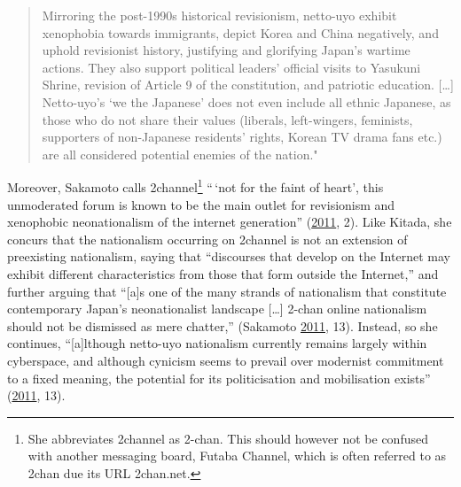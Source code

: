 \documentclass[10pt,british,A4paper,,openany]{memoir}
\begin{document}
\begin{quote}
Mirroring the post-1990s historical revisionism, netto-uyo exhibit
xenophobia towards immigrants, depict Korea and China negatively, and
uphold revisionist history, justifying and glorifying Japan's wartime
actions. They also support political leaders' official visits to
Yasukuni Shrine, revision of Article 9 of the constitution, and
patriotic education. {[}\ldots{}{]} Netto-uyo's `we the Japanese' does
not even include all ethnic Japanese, as those who do not share their
values (liberals, left-wingers, feminists, supporters of non-Japanese
residents' rights, Korean TV drama fans etc.) are all considered
potential enemies of the nation."
\end{quote}

Moreover, Sakamoto calls 2channel\footnote{She abbreviates 2channel as
  2-chan. This should however not be confused with another messaging
  board, Futaba Channel, which is often referred to as 2chan due its URL
  2chan.net.} ``\,`not for the faint of heart', this unmoderated forum
is known to be the main outlet for revisionism and xenophobic
neonationalism of the internet generation''
(\protect\hyperlink{ref-sakamoto_koreans_2011}{2011}, 2). Like Kitada,
she concurs that the nationalism occurring on 2channel is not an
extension of preexisting nationalism, saying that ``discourses that
develop on the Internet may exhibit different characteristics from those
that form outside the Internet,'' and further arguing that ``{[}a{]}s
one of the many strands of nationalism that constitute contemporary
Japan's neonationalist landscape {[}\ldots{}{]} 2-chan online
nationalism should not be dismissed as mere chatter,'' (Sakamoto
\protect\hyperlink{ref-sakamoto_koreans_2011}{2011}, 13). Instead, so
she continues, ``{[}a{]}lthough netto-uyo nationalism currently remains
largely within cyberspace, and although cynicism seems to prevail over
modernist commitment to a fixed meaning, the potential for its
politicisation and mobilisation exists''
(\protect\hyperlink{ref-sakamoto_koreans_2011}{2011}, 13).
\end{document}
